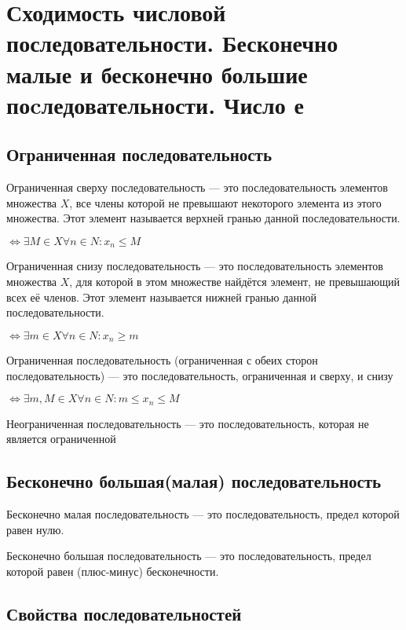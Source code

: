 \section{Сходимость числовой последовательности. Бесконечно малые и бесконечно большие поcледовательности. Число е}

\subsection{Ограниченная последовательность}

Ограниченная сверху последовательность — это последовательность элементов множества $X$, все члены которой не превышают некоторого элемента из этого множества. Этот элемент называется верхней гранью данной последовательности.

$ \Leftrightarrow \exists M \in X  \forall n \in N \colon x_n \leqslant M $

Ограниченная снизу последовательность — это последовательность элементов множества $X$, для которой в этом множестве найдётся элемент, не превышающий всех её членов. Этот элемент называется нижней гранью данной последовательности.

$\Leftrightarrow \exists m \in X  \forall n \in N \colon x_n \geqslant m $

Ограниченная последовательность (ограниченная с обеих сторон последовательность) — это последовательность, ограниченная и сверху, и снизу

$\Leftrightarrow \exists m,M \in X  \forall n \in N \colon m \leqslant x_n \leqslant M $

Неограниченная последовательность — это последовательность, которая не является ограниченной

\subsection{Бесконечно большая(малая) последовательность}

Бесконечно малая последовательность — это последовательность, предел которой равен нулю.

Бесконечно большая последовательность — это последовательность, предел которой равен (плюс-минус) бесконечности.

\subsection{Свойства последовательностей}

